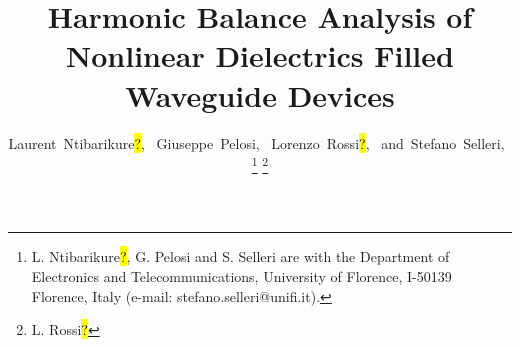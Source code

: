 \documentclass[journal]{IEEEtran}
\begin{document}

%
\title{Harmonic Balance Analysis of Nonlinear Dielectrics Filled Waveguide Devices}
%
%
%
\author{ Laurent~Ntibarikure\hl{?},~
		Giuseppe~Pelosi,~
		Lorenzo~Rossi\hl{?},~%
        and~Stefano~Selleri,~%
		\thanks{ L. Ntibarikure\hl{?}, G. Pelosi and S. Selleri are with the Department of Electronics and Telecommunications, University of Florence, I-50139 Florence, Italy (e-mail:
stefano.selleri@unifi.it).} %
		\thanks{ L. Rossi\hl{?}} }
 

% 
%
\end{document}
